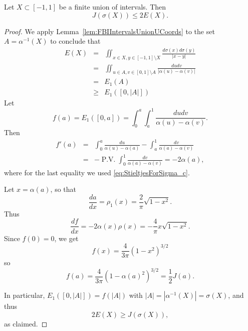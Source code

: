 \begin{lemma} \label{lem:FBIIntervals}
    Let $X\subset[-1,1]$ be a finite union of intervals. Then
    \[
   J(\sigma(X))\leq 2 E(X).
    \]
\end{lemma}
\begin{proof}
    We apply Lemma~\ref{lem:FBIIntervalsUnionUCoords} to the set $A = \alpha^{-1}(X)$ to conclude that 
    \begin{eqnarray*}
        E(X) &=& \iint_{x\in X,y\in [-1,1]\setminus X} \frac{d\sigma(x)d\sigma(y)}{|x-y|}  \\
        &=& \iint_{u\in A,v\in[0,1]\setminus A}\frac{dudv }{|\alpha(u)-\alpha(v)|}  \\ 
        &=& E_1(A) \\ 
        &\geq& E_1([0,|A|]) 
    \end{eqnarray*}
    Let $$f(a) = E_1([0,a]) = 
        \int_{0}^{a} \int_{a}^1 \frac{dudv}{\alpha(u)-\alpha(v)}.$$
    Then 
    \begin{eqnarray*}f'(a) &=& \int_{0}^a \frac{du}{\alpha(u)-\alpha(a)}  -\int_{a}^1 \frac{dv}{\alpha(a)-\alpha(v) } \\&=& 
    - \operatorname{P.V.} \int_{0}^1 \frac{dv}{\alpha(a)-\alpha(v)} = -2 \alpha(a), \end{eqnarray*} where for the last equality we used \eqref{eq:StieltjesForSigma_c}.

    Let $x=\alpha(a)$, so that $$\frac{da}{dx} = \rho_1(x) = \frac{2}{\pi}{\sqrt{1-x^2}}.$$ Thus
    $$\frac{df}{dx} = -2\alpha(x) \rho(x) = -\frac{4}{\pi} x\sqrt{1-x^2}.$$  Since $f(0)=0$, we get $$f(x) = \frac{4}{3\pi} (1-x^2)^{3/2}$$ so $$f(a) = \frac{4}{3\pi} (1-\alpha(a)^2)^{3/2} = \frac{1}{2}J(a). $$

    In particular, $E_1([0,|A|]) = f(|A|)$ with $|A| = |\alpha^{-1}(X)| =\sigma(X)$, and thus 
    $$2E(X)\geq J(\sigma(X)),$$ as claimed.
\end{proof}



